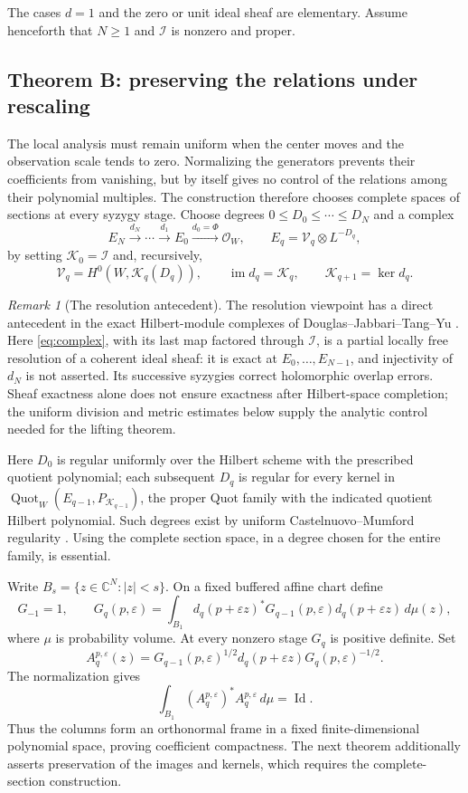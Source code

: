 \documentclass[11pt,reqno]{amsart}
\theoremstyle{remark}
\newtheorem*{remark}{Remark}
\newcommand{\C}{\mathbb C}
\newcommand{\cO}{\mathcal O}
\newcommand{\cI}{\mathscr I}
\newcommand{\cK}{\mathscr K}
\newcommand{\eps}{\varepsilon}
\DeclareMathOperator{\im}{im}
\DeclareMathOperator{\Quot}{Quot}
\DeclareMathOperator{\Id}{Id}
\begin{document}
The cases $d=1$ and the zero or unit ideal sheaf are elementary.
Assume henceforth that $N\ge1$ and $\cI$ is nonzero and proper.

\subsection{Theorem B: preserving the relations under rescaling}
The local analysis must remain uniform when the center moves and the
observation scale tends to zero. Normalizing the generators prevents
their coefficients from vanishing, but by itself gives no control of
the relations among their polynomial multiples. The construction
therefore chooses complete spaces of sections at every syzygy stage. Choose degrees $0\le D_0\le\cdots\le D_N$ and a complex
\begin{equation}\label{eq:complex}
 E_N\xrightarrow{d_N}\cdots\xrightarrow{d_1}E_0
 \xrightarrow{d_0=\Phi}\cO_W,
 \qquad E_q=\mathcal V_q\otimes L^{-D_q},
\end{equation}
by setting $\cK_0=\cI$ and, recursively,
\[
 \mathcal V_q=H^0(W,\cK_q(D_q)),\qquad
 \im d_q=\cK_q,\qquad \cK_{q+1}=\ker d_q.
\]
\begin{remark}[The resolution antecedent]
The resolution viewpoint has a direct antecedent in the exact
Hilbert-module complexes of Douglas--Jabbari--Tang--Yu
\cite{DouglasJabbariTangYu}. Here \eqref{eq:complex}, with its last
map factored through $\cI$, is a partial locally free resolution of a
coherent ideal sheaf: it is exact at $E_0,\ldots,E_{N-1}$, and
injectivity of $d_N$ is not asserted. Its successive syzygies correct
holomorphic overlap errors. Sheaf exactness alone does not ensure
exactness after Hilbert-space completion; the uniform division and
metric estimates below supply the analytic control needed for the
lifting theorem.
\end{remark}

Here $D_0$ is regular uniformly over the Hilbert scheme with the
prescribed quotient polynomial; each subsequent $D_q$ is regular for
every kernel in $\Quot_W(E_{q-1},P_{\cK_{q-1}})$, the proper Quot
family with the indicated quotient Hilbert polynomial.
Such degrees exist by uniform Castelnuovo--Mumford regularity
\cite{Stacks}. Using the complete section space, in a degree chosen
for the entire family, is essential.

Write $B_s=\{z\in\C^N:|z|<s\}$. On a fixed buffered affine chart define
\begin{equation}\label{eq:gram}
 G_{-1}=1,\qquad
 G_q(p,\eps)=\int_{B_1}d_q(p+\eps z)^*G_{q-1}(p,\eps)
                    d_q(p+\eps z)\,d\mu(z),
\end{equation}
where $\mu$ is probability volume. At every nonzero stage $G_q$ is
positive definite. Set
\begin{equation}\label{eq:normalized}
 A_q^{p,\eps}(z)=G_{q-1}(p,\eps)^{1/2}
 d_q(p+\eps z)G_q(p,\eps)^{-1/2}.
\end{equation}
The normalization gives
\[
\int_{B_1}(A_q^{p,\eps})^*A_q^{p,\eps}\,d\mu=\Id.
\]
Thus the columns form an orthonormal frame in a fixed
finite-dimensional polynomial space, proving coefficient compactness.
The next theorem additionally asserts preservation of the images
and kernels, which requires the complete-section construction.
\end{document}
